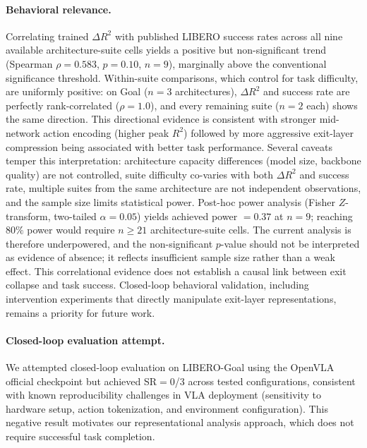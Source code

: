 \paragraph{Behavioral relevance.}
Correlating trained $\Delta R^2$ with published LIBERO success rates across all nine available architecture-suite cells yields a positive but non-significant trend (Spearman $\rho = 0.583$, $p = 0.10$, $n = 9$), marginally above the conventional significance threshold.
Within-suite comparisons, which control for task difficulty, are uniformly positive: on Goal ($n = 3$ architectures), $\Delta R^2$ and success rate are perfectly rank-correlated ($\rho = 1.0$), and every remaining suite ($n = 2$ each) shows the same direction.
This directional evidence is consistent with stronger mid-network action encoding (higher peak $R^2$) followed by more aggressive exit-layer compression being associated with better task performance.
Several caveats temper this interpretation: architecture capacity differences (model size, backbone quality) are not controlled, suite difficulty co-varies with both $\Delta R^2$ and success rate, multiple suites from the same architecture are not independent observations, and the sample size limits statistical power.
Post-hoc power analysis (Fisher $Z$-transform, two-tailed $\alpha = 0.05$) yields achieved power $= 0.37$ at $n = 9$; reaching $80\%$ power would require $n \geq 21$ architecture-suite cells.
The current analysis is therefore underpowered, and the non-significant $p$-value should not be interpreted as evidence of absence; it reflects insufficient sample size rather than a weak effect.
This correlational evidence does not establish a causal link between exit collapse and task success.
Closed-loop behavioral validation, including intervention experiments that directly manipulate exit-layer representations, remains a priority for future work.

\paragraph{Closed-loop evaluation attempt.}
We attempted closed-loop evaluation on LIBERO-Goal using the OpenVLA official checkpoint but achieved SR$=$0/3 across tested configurations, consistent with known reproducibility challenges in VLA deployment (sensitivity to hardware setup, action tokenization, and environment configuration).
This negative result motivates our representational analysis approach, which does not require successful task completion.

